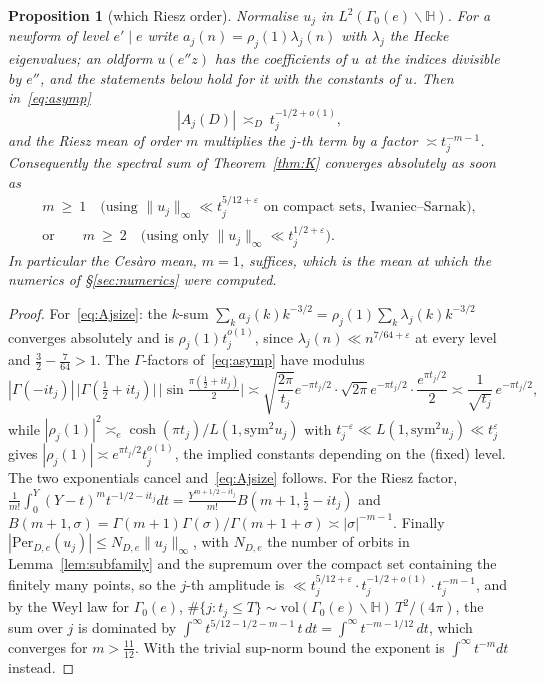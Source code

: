\documentclass[11pt,a4paper]{article}
\newtheorem{proposition}[theorem]{Proposition}
\theoremstyle{remark}\newtheorem{remark}[theorem]{Remark}
\begin{document}
\begin{proposition}[which Riesz order]\label{prop:riesz}
Normalise $u_j$ in $L^2(\Gamma_0(e)\backslash\mathbb H)$. For a newform of level $e'\mid e$ write
$a_j(n)=\rho_j(1)\lambda_j(n)$ with $\lambda_j$ the Hecke eigenvalues; an oldform $u(e''z)$ has the coefficients of $u$
at the indices divisible by $e''$, and the statements below hold for it with the constants of $u$. Then
in~\eqref{eq:asymp}
\begin{equation}\label{eq:Ajsize}
|A_j(D)|\ \asymp_D\ t_j^{-1/2+o(1)} ,
\end{equation}
and the Riesz mean of order $m$ multiplies the $j$-th term by a factor $\asymp t_j^{-m-1}$. Consequently the
spectral sum of Theorem~\ref{thm:K} converges absolutely as soon as
\[
\begin{gathered}
m\ \ge\ 1\quad\text{(using }\|u_j\|_\infty\ll t_j^{5/12+\varepsilon}\text{ on compact sets, Iwaniec--Sarnak)},\\
\text{or}\qquad m\ \ge\ 2\quad\text{(using only }\|u_j\|_\infty\ll t_j^{1/2+\varepsilon}\text{)} .
\end{gathered}
\]
In particular the Ces\`aro mean, $m=1$, suffices, which is the mean at which the numerics of \S\ref{sec:numerics}
were computed.
\end{proposition}
\begin{proof}
For~\eqref{eq:Ajsize}: the $k$-sum $\sum_ka_j(k)k^{-3/2}=\rho_j(1)\sum_k\lambda_j(k)k^{-3/2}$ converges absolutely
and is $\rho_j(1)t_j^{o(1)}$, since $\lambda_j(n)\ll n^{7/64+\varepsilon}$ at every level~\cite{KimSarnak2003} and
$\tfrac32-\tfrac7{64}>1$. The
$\Gamma$-factors of~\eqref{eq:asymp} have modulus
\[
|\Gamma(-it_j)|\,\bigl|\Gamma(\tfrac12+it_j)\bigr|\,\bigl|\sin\tfrac{\pi(\frac12+it_j)}2\bigr|
\asymp\sqrt{\frac{2\pi}{t_j}}e^{-\pi t_j/2}\cdot\sqrt{2\pi}e^{-\pi t_j/2}\cdot\frac{e^{\pi t_j/2}}2
\asymp\frac{1}{\sqrt{t_j}}\,e^{-\pi t_j/2},
\]
while $|\rho_j(1)|^2\asymp_e\cosh(\pi t_j)/L(1,\mathrm{sym}^2u_j)$ with $t_j^{-\varepsilon}\ll L(1,\mathrm{sym}^2u_j)\ll t_j^{\varepsilon}$
\cite{HoffsteinLockhart1994} gives $|\rho_j(1)|\asymp e^{\pi t_j/2}t_j^{o(1)}$, the implied constants depending on the
(fixed) level.
The two exponentials cancel and~\eqref{eq:Ajsize} follows. For the Riesz factor,
$\frac1{m!}\int_0^Y(Y-t)^mt^{-1/2-it_j}dt=\frac{Y^{m+1/2-it_j}}{m!}B(m+1,\tfrac12-it_j)$ and
$B(m+1,\sigma)=\Gamma(m+1)\Gamma(\sigma)/\Gamma(m+1+\sigma)\asymp|\sigma|^{-m-1}$. Finally
$|\mathrm{Per}_{D,e}(u_j)|\le N_{D,e}\|u_j\|_\infty$, with $N_{D,e}$ the number of orbits in Lemma~\ref{lem:subfamily}
and the supremum over the compact set containing the finitely many points, so the $j$-th amplitude is
$\ll t_j^{5/12+\varepsilon}\cdot t_j^{-1/2+o(1)}\cdot t_j^{-m-1}$, and by the Weyl law for $\Gamma_0(e)$,
$\#\{j:t_j\le T\}\sim\mathrm{vol}(\Gamma_0(e)\backslash\mathbb H)\,T^2/(4\pi)$, the sum over $j$ is dominated by $\int^\infty t^{5/12-1/2-m-1}\,t\,dt=\int^\infty t^{-m-1/12}\,dt$,
which converges for $m>\tfrac{11}{12}$. With the trivial sup-norm bound the exponent is $\int^\infty t^{-m}dt$ instead.
\end{proof}
\end{document}
